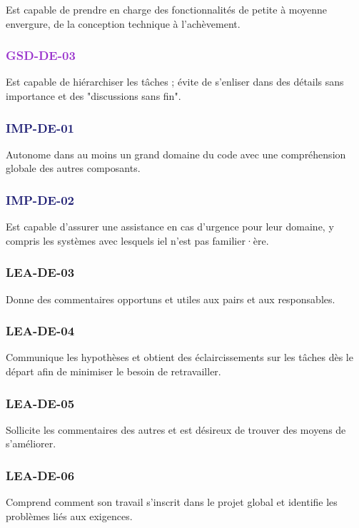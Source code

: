 \documentclass[a4paper, french, openany, 12pt]{book}
\newcommand\str[1]{\textcolor{DarkOrchid}{\textbf{\uppercase{gsd-{#1}}}}}
\newcommand\wis[1]{\textcolor{MidnightBlue}{\textbf{\uppercase{imp-{#1}}}}}
\newcommand\cha[1]{\textcolor{OliveGreen}{\textbf{\uppercase{lea-{#1}}}}}
\begin{document}
\begin{multicols}{2}
  Est capable de prendre en charge des fonctionnalités de petite à moyenne envergure, de la conception technique à 
  l'achèvement.

  \subsubsection*{\str{de-03}}

  Est capable de hiérarchiser les tâches ; évite de s'enliser dans des détails sans importance et des "discussions sans 
  fin".

  \subsubsection*{\wis{de-01}}

  Autonome dans au moins un grand domaine du code avec une compréhension globale des autres composants.

  \subsubsection*{\wis{de-02}}

  Est capable d'assurer une assistance en cas d'urgence pour leur domaine, y compris les systèmes avec lesquels iel 
  n'est pas familier·ère.

  \subsubsection*{\cha{de-03}}

  Donne des commentaires opportuns et utiles aux pairs et aux responsables.

  \subsubsection*{\cha{de-04}}

  Communique les hypothèses et obtient des éclaircissements sur les tâches dès le départ afin de minimiser le besoin de 
  retravailler.

  \subsubsection*{\cha{de-05}}

  Sollicite les commentaires des autres et est désireux de trouver des moyens de s'améliorer.

  \subsubsection*{\cha{de-06}}

  Comprend comment son travail s'inscrit dans le projet global et identifie les problèmes liés aux exigences.

\end{multicols}
\end{document}
